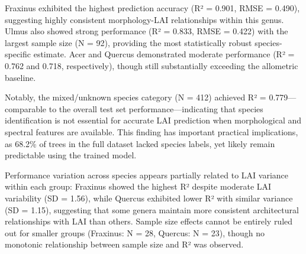 \documentclass[11pt]{article}
\begin{document}
Fraxinus exhibited the highest prediction accuracy (R² = 0.901, RMSE = 0.490), suggesting highly consistent morphology-LAI relationships within this genus. Ulmus also showed strong performance (R² = 0.833, RMSE = 0.422) with the largest sample size (N = 92), providing the most statistically robust species-specific estimate. Acer and Quercus demonstrated moderate performance (R² = 0.762 and 0.718, respectively), though still substantially exceeding the allometric baseline.

Notably, the mixed/unknown species category (N = 412) achieved R² = 0.779---comparable to the overall test set performance---indicating that species identification is not essential for accurate LAI prediction when morphological and spectral features are available. This finding has important practical implications, as 68.2\% of trees in the full dataset lacked species labels, yet likely remain predictable using the trained model.

Performance variation across species appears partially related to LAI variance within each group: Fraxinus showed the highest R² despite moderate LAI variability (SD = 1.56), while Quercus exhibited lower R² with similar variance (SD = 1.15), suggesting that some genera maintain more consistent architectural relationships with LAI than others. Sample size effects cannot be entirely ruled out for smaller groups (Fraxinus: N = 28, Quercus: N = 23), though no monotonic relationship between sample size and R² was observed.
\end{document}
